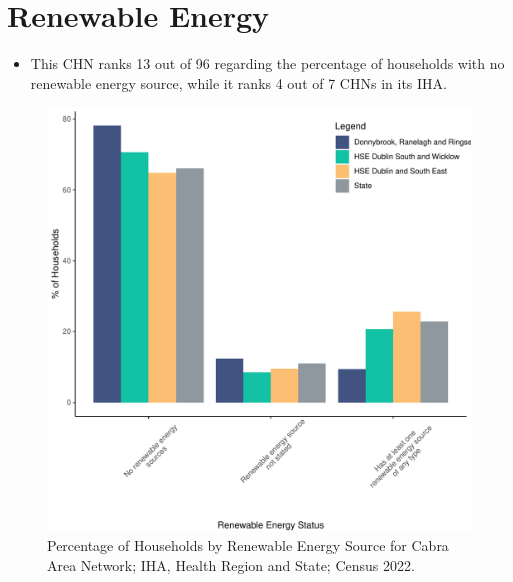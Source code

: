\documentclass{article}
\begin{document}
\section{Renewable Energy}\label{sect:RE}
\begin{itemize}
\item This CHN ranks  13 out of 96 regarding the percentage of households with no renewable energy source, while it ranks   4 out of 7 CHNs in its IHA.
\end{itemize}
\begin{figure}[H]
	\centering
	\includegraphics[width = 140mm]{../figures/RenewableEnergyED.pdf}
	\caption{Percentage of Households by Renewable Energy Source for Cabra Area Network; IHA, Health Region and State; Census 2022.}
	\label{fig:vbnv}
	\end{figure}
\end{document}
